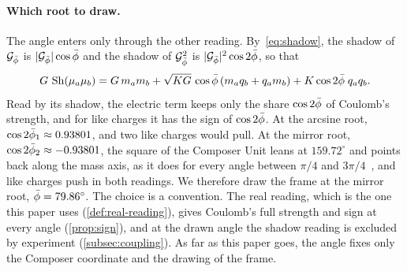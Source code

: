 \paragraph{Which root to draw.} The angle enters only through the other reading. By~\cref{eq:shadow}, the shadow of $\mathcal{G}_{\bar{\phi}}$ is $\lvert\mathcal{G}_{\bar{\phi}}\rvert\cos\bar{\phi}$ and the shadow of $\mathcal{G}_{\bar{\phi}}^2$ is $\lvert\mathcal{G}_{\bar{\phi}}\rvert^2\cos 2\bar{\phi}$, so that
\begin{equation}\label{eq:shadow-law}
G\,\operatorname{Sh}(\mu_a\mu_b) = G\,m_a m_b + \sqrt{KG}\,\cos\bar{\phi}\,(m_a q_b + q_a m_b) + K\cos 2\bar{\phi}\;q_a q_b .
\end{equation}
Read by its shadow, the electric term keeps only the share $\cos 2\bar{\phi}$ of Coulomb's strength, and for like charges it has the sign of $\cos 2\bar{\phi}$. At the arcsine root, $\cos 2\bar{\phi}_1 \approx 0.93801$, and two like charges would pull. At the mirror root, $\cos 2\bar{\phi}_2 \approx -0.93801$, the square of the Composer Unit leans at $159.72^\circ$ and points back along the mass axis, as it does for every angle between $\pi/4$ and $3\pi/4$~\citep[Theorem~3.7]{DerrazGN2026}, and like charges push in both readings. We therefore draw the frame at the mirror root, $\bar{\phi} = 79.86^\circ$. The choice is a convention. The real reading, which is the one this paper uses (\cref{def:real-reading}), gives Coulomb's full strength and sign at every angle (\cref{prop:sign}), and at the drawn angle the shadow reading is excluded by experiment (\cref{subsec:coupling}). As far as this paper goes, the angle fixes only the Composer coordinate and the drawing of the frame.


